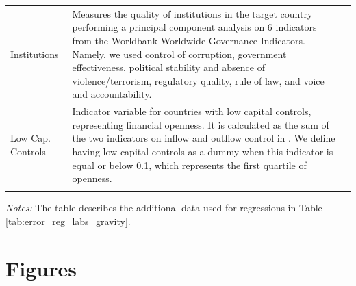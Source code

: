 \documentclass[letterpaper,12pt]{article}
\newenvironment{tabnote}{\footnotesize \begin{singlespace} \noindent }{\end{singlespace} \par}
\begin{document}
{\begin{table}[H]
{\begin{tabularx}{\linewidth}{p{2cm} p{10cm} p{4cm}}
			Institutions & Measures the quality of institutions in the target country performing a principal component analysis on 6 indicators from the Worldbank Worldwide Governance Indicators. Namely, we used control of corruption, government effectiveness, political stability and absence of violence/terrorism, regulatory quality, rule of law, and voice and accountability.  & \citep{kaufmann2023} \tabularnewline
			Low Cap. Controls & Indicator variable for countries with low capital controls, representing financial openness. It is calculated as the sum of the two indicators on inflow and outflow control in  \citet{Fernandez2016}.  We define having low capital controls as a dummy when this indicator is equal or below 0.1, which represents the first quartile of openness.  & \citet{Fernandez2016} \tabularnewline
			\bottomrule \addlinespace[\belowrulesep]
			
		\end{tabularx}
		\begin{flushleft}
			\footnotesize \begin{minipage}{1\textwidth} \vspace{-10pt} \begin{tabnote}  \textit{Notes:} The table describes the additional data used for regressions in Table \ref{tab:error_reg_labs_gravity}. \end{tabnote} \end{minipage}  
		\end{flushleft}
	}
\end{table}

}





\newpage
\section{Figures}
\end{document}

